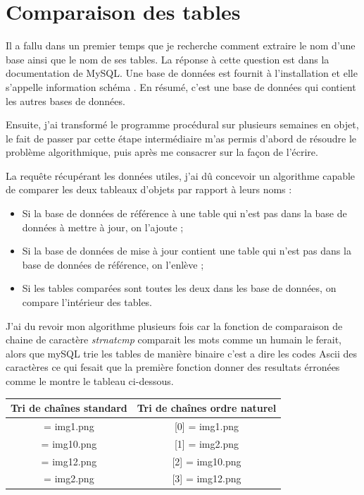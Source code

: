 \section{Comparaison des tables}


Il a fallu dans un premier temps que je recherche comment extraire le nom d'une
base ainsi que le nom de ses tables. La réponse à cette question est dans la
documentation de MySQL. Une base de données est fournit à l'installation et
elle s'appelle \og information schéma \fg{} . En résumé, c'est une base de
données qui contient les autres bases de données.

Ensuite, j'ai transformé le programme procédural sur plusieurs semaines en
objet, le fait de passer par cette étape intermédiaire m'as permis d'abord de
résoudre le problème algorithmique, puis après me consacrer sur la façon de
l'écrire.

La requête récupérant les données utiles, j'ai dû concevoir un algorithme
capable de comparer les deux tableaux d'objets par rapport à leurs noms :
\begin{itemize}
    \item Si la base de données de référence à une table qui n'est pas dans
    la base de données à mettre à jour, on l'ajoute ;
    \item Si la base de données de mise à jour contient une table qui n'est
    pas dans la base de données de référence, on l'enlève ;
    \item Si les tables comparées sont toutes les deux dans les base de
    données, on compare l'intérieur des tables.
\end{itemize}

J'ai du revoir mon algorithme plusieurs fois car la fonction de comparaison de
chaine de caractère \emph{strnatcmp} comparait les mots comme un humain le
ferait, alors que mySQL trie les tables de manière binaire c'est a dire les
codes Ascii des caractères ce qui fesait que la première fonction donner des
resultats érronées comme le montre le tableau ci-dessous.

\begin{center}
\begin{tabular}{|c|c|}
\hline
\textbf{Tri de chaînes standard} & \textbf{Tri de chaînes ordre naturel} \\
\hline
[0] = img1.png & [0] = img1.png \\
\hline
[1] = img10.png & [1] = img2.png \\
\hline
[2] = img12.png & [2] = img10.png \\
\hline
[3] = img2.png & [3] = img12.png \\
\hline
\end{tabular}
\end{center}

